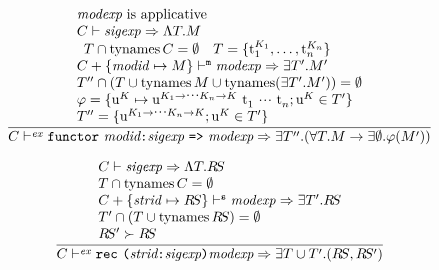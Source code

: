 \begin{equation}		%
\label{appfunctormodexp-rule}
\frac{\begin{array}{l}
      \mbox{\modexp\ is applicative}\\
      \C\ts\sigexp\ra\sig{\T}{\M} \\
      \begin{array}{lr}
      \T \cap \TyNamesFcn \C = \emptyset & 
      \T = \{\t[\K_1]_1,\ldots,\t[\K_{n}]_n\}
      \end{array}\\
      \C+\{\modid\mapsto\M\}\ts^\expectmod\modexp\ra\exmod{\T'}{\M'} \\
      \T'' \cap (\T \cup \TyNamesFcn M \cup \TyNamesFcn (\exmod{\T'}{\M'}))
           = \emptyset \\
      \tyrea = \{ \u[\K] \mapsto
                    \u[\Karr{\K_1}{\cdots\Karr{\K_n}{\K}}]\ \t_1\ \cdots\ \t_n;
                  \u[\K] \in \T'\} \\
      \T'' = \{\u[\Karr{\K_1}{\cdots\Karr{\K_n}{\K}}];  \u[\K] \in \T'
      \}
      \end{array}
     }
     {\C\ts^\expect\appfunctormodexp\ra\exmod{\T''}{(\fun{\T}{\M}{\exmod{\emptyset}{\tyrea(\M')}})}}
\end{equation}


\begin{equation}		%
\label{recmodexp-rule}
\frac{\begin{array}{l}
      \C\ts\sigexp\ra\sig{\T}{\RS} \\
      \T \cap \TyNamesFcn \C = \emptyset \\ 
      \C+\{\strid\mapsto\RS\}\ts^\expectstr\modexp\ra\exmod{\T'}{\RS} \\
      \T' \cap (\T \cup \TyNamesFcn \RS) = \emptyset \\ 
      \RS' \succ \RS
      \end{array}
     }
     {\C\ts^\expect\recmodexp\ra\exmod{\T\cup\T'}{\recstr{\RS}{\RS'}}}
\end{equation}



